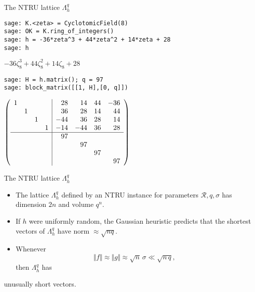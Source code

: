 \documentclass[presentation,smaller]{beamer}
\newcommand{\cR}{\ensuremath{\mathcal{R}}\xspace}
\begin{document}
\begin{frame}[fragile,label={sec:orgfe9a6ea}]{The NTRU lattice \(\Lambda^q_h\)}
 \lstset{language=sage,label= ,caption= ,captionpos=b,numbers=none}
\begin{lstlisting}
sage: K.<zeta> = CyclotomicField(8)
sage: OK = K.ring_of_integers()
sage: h = -36*zeta^3 + 44*zeta^2 + 14*zeta + 28
sage: h
\end{lstlisting}

\(-36 \zeta_{8}^{3} + 44 \zeta_{8}^{2} + 14 \zeta_{8} + 28\)


\lstset{language=sage,label= ,caption= ,captionpos=b,numbers=none}
\begin{lstlisting}
sage: H = h.matrix(); q = 97
sage: block_matrix([[1, H],[0, q]])
\end{lstlisting}

\begin{small}
\(\left(\begin{array}{rrrr|rrrr}
1 &   &   &   & 28 & 14 & 44 & -36 \\
  & 1 &   &   & 36 & 28 & 14 & 44 \\
  &   & 1 &   & -44 & 36 & 28 & 14 \\
  &   &   & 1 & -14 & -44 & 36 & 28 \\
\hline
   &   &   &   & 97 &   &   &   \\
  &   &   &   &   & 97 &   &   \\
  &   &   &   &   &   & 97 &   \\
  &   &   &   &   &   &   & 97
\end{array}\right)\)
\end{small}
\end{frame}

\begin{frame}[label={sec:org51dc29f}]{The NTRU lattice \(\Lambda^q_h\)}
\begin{itemize}
\item The lattice \(\Lambda^q_h\) defined by an NTRU instance for parameters \(\cR, q, σ\) has dimension \(2n\) and volume \(q^n\).
\item If \(h\) were uniformly random, the Gaussian heuristic predicts that the shortest vectors of \(\Lambda_h^q\) have norm \(≈ \sqrt{n q}\).
\item Whenever \[\Vert f \Vert ≈ \Vert g \Vert ≈ \sqrt{n}\,σ \ll \sqrt{n\,q},\] then \(\Lambda^q_h\) has
\end{itemize}
\begin{center}
\alert{unusually short vectors}.
\end{center}
\end{frame}
\end{document}
